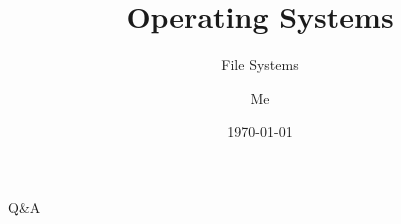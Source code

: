 \documentclass[12pt]{beamer}
\title{Operating Systems}
\subtitle{File Systems}
\author{Me}
\date{\today}
\begin{document}
  \begin{frame}
    \titlepage
  \end{frame}

  
  
  
  
  
  
  

  \begin{frame}
  \begin{center}
  \Huge Q\&A
  \end{center}
  \end{frame}
\end{document}
